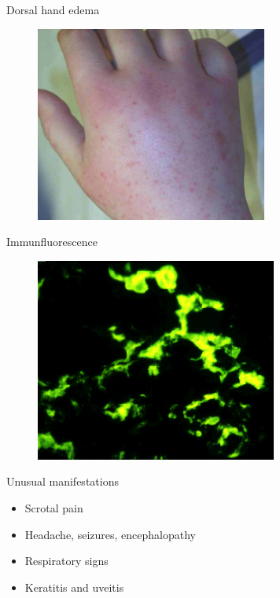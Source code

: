 \begin{frame}{Dorsal hand edema}

\begin{figure}
\includegraphics[scale=0.5]{./img/IgAV_HSP_dorsal_edema_scale_crop.jpg}
\end{figure}

\end{frame}

\begin{frame}{Immunfluorescence}

\begin{figure}
\includegraphics[scale=0.5]{./img/IgA_nephropathy_IF.jpg}
\end{figure}

\end{frame}

\begin{frame}{Unusual manifestations}

\begin{itemize}
\itemsep1pt\parskip0pt
\item
  Scrotal pain
\item
  Headache, seizures, encephalopathy
\item
  Respiratory signs
\item
  Keratitis and uveitis
\end{itemize}

\end{frame}

